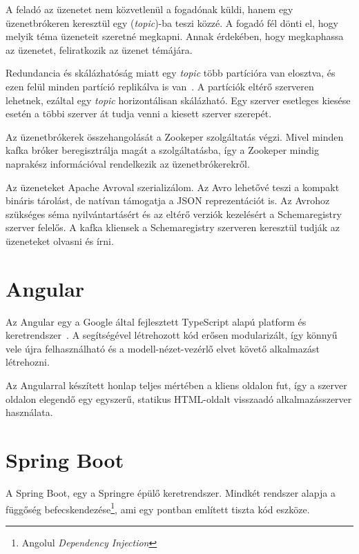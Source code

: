 A feladó az üzenetet nem közvetlenül a fogadónak küldi, hanem egy üzenetbrókeren keresztül egy (\emph{topic})-ba teszi közzé. A fogadó fél dönti el, hogy melyik téma üzeneteit szeretné megkapni. Annak érdekében, hogy megkaphassa az üzenetet, feliratkozik az üzenet témájára.

Redundancia és skálázhatóság miatt egy \emph{topic} több partícióra van elosztva, és ezen felül minden partíció replikálva is van~\cite{OReally_Kafka_Internals}. A partíciók eltérő szerveren lehetnek, ezáltal egy \emph{topic} horizontálisan skálázható. Egy szerver esetleges kiesése esetén a többi szerver át tudja venni a kiesett szerver szerepét.

Az üzenetbrókerek összehangolását a Zookeper szolgáltatás végzi. Mivel minden kafka bróker beregisztrálja magát a szolgáltatásba, így a Zookeper mindig naprakész információval rendelkezik az üzenetbrókerekről.

Az üzeneteket Apache Avroval szerializálom. Az Avro lehetővé teszi a kompakt bináris tárolást, de natívan támogatja a JSON reprezentációt is. Az Avrohoz szükséges séma nyilvántartásért és az eltérő verziók kezelésért a Schemaregistry szerver felelős. A kafka kliensek a Schemaregistry szerveren keresztül tudják az üzeneteket olvasni és írni. 



\section{Angular}\label{sec:angular}
Az \foreignlanguage{british}{Angular} egy a \foreignlanguage{british}{Google} által fejlesztett \foreignlanguage{british}{TypeScript} alapú platform és	keretrendszer~\cite{angular_docs}. A segítségével létrehozott kód erősen modularizált, így könnyű vele újra felhasználható és a modell-nézet-vezérlő elvet követő alkalmazást létrehozni.

Az Angularral készített honlap teljes mértében a kliens oldalon fut, így a szerver oldalon elegendő egy egyszerű, statikus HTML-oldalt visszaadó alkalmazásszerver használata.


\section{Spring Boot}\label{sec:spring_boot}
A \foreignlanguage{british}{Spring Boot}, egy a Springre épülő keretrendszer. Mindkét rendszer alapja a függőség befecskendezése\footnote{Angolul \foreignlanguage{british}{\emph{Dependency Injection}}}, ami egy  pontban említett tiszta kód \cite{clean_code_chapter_systems} eszköze.

